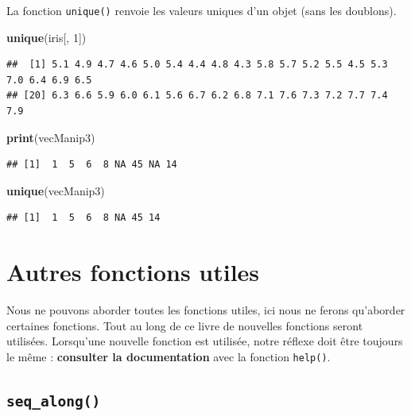 \documentclass[
]{book}
\newenvironment{Shaded}{\begin{snugshade}}{\end{snugshade}}
\newcommand{\DecValTok}[1]{\textcolor[rgb]{0.00,0.00,0.81}{#1}}
\newcommand{\KeywordTok}[1]{\textcolor[rgb]{0.13,0.29,0.53}{\textbf{#1}}}
\newcommand{\NormalTok}[1]{#1}
\begin{document}
La fonction \texttt{unique()} renvoie les valeurs uniques d'un objet (sans les doublons).

\begin{Shaded}
\begin{Highlighting}[]
\KeywordTok{unique}\NormalTok{(iris[, }\DecValTok{1}\NormalTok{])}
\end{Highlighting}
\end{Shaded}

\begin{verbatim}
##  [1] 5.1 4.9 4.7 4.6 5.0 5.4 4.4 4.8 4.3 5.8 5.7 5.2 5.5 4.5 5.3 7.0 6.4 6.9 6.5
## [20] 6.3 6.6 5.9 6.0 6.1 5.6 6.7 6.2 6.8 7.1 7.6 7.3 7.2 7.7 7.4 7.9
\end{verbatim}

\begin{Shaded}
\begin{Highlighting}[]
\KeywordTok{print}\NormalTok{(vecManip3)}
\end{Highlighting}
\end{Shaded}

\begin{verbatim}
## [1]  1  5  6  8 NA 45 NA 14
\end{verbatim}

\begin{Shaded}
\begin{Highlighting}[]
\KeywordTok{unique}\NormalTok{(vecManip3)}
\end{Highlighting}
\end{Shaded}

\begin{verbatim}
## [1]  1  5  6  8 NA 45 14
\end{verbatim}

\hypertarget{autres-fonctions-utiles}{%
\section{Autres fonctions utiles}\label{autres-fonctions-utiles}}

Nous ne pouvons aborder toutes les fonctions utiles, ici nous ne ferons qu'aborder certaines fonctions. Tout au long de ce livre de nouvelles fonctions seront utilisées. Lorsqu'une nouvelle fonction est utilisée, notre réflexe doit être toujours le même : \textbf{consulter la documentation} avec la fonction \texttt{help()}.

\hypertarget{l015seqalong}{%
\subsection{\texorpdfstring{\texttt{seq\_along()}}{seq\_along()}}\label{l015seqalong}}
\end{document}
